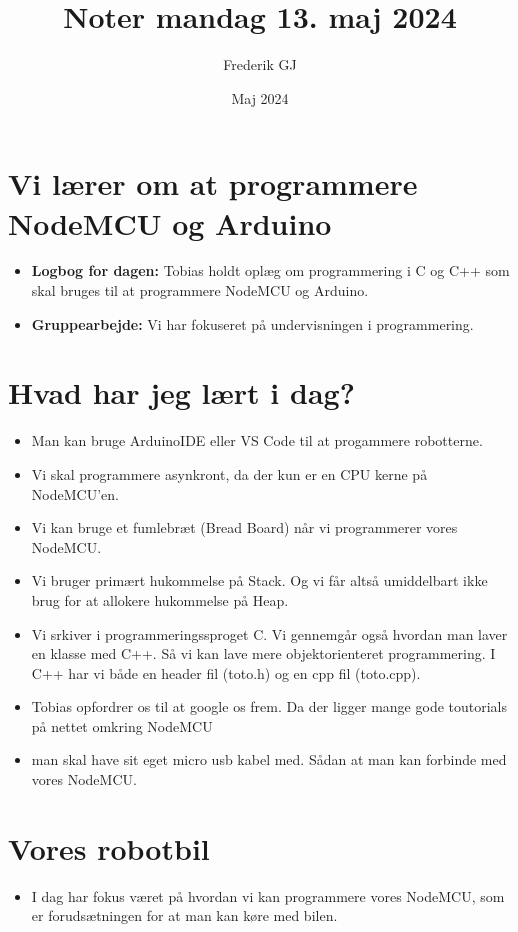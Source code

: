 \documentclass{article}
\title{Noter mandag 13. maj 2024}
\author{Frederik GJ}
\date{Maj 2024}
\begin{document}
\maketitle

\section{Vi lærer om at programmere NodeMCU og Arduino}

\begin{itemize}
    \item \textbf{Logbog for dagen:} Tobias holdt oplæg om programmering i C og C++ som skal bruges til at programmere NodeMCU og Arduino. 
    \item \textbf{Gruppearbejde:} Vi har fokuseret på undervisningen i programmering. 
\end{itemize}

\section{Hvad har jeg lært i dag?}
\begin{itemize}
    \item Man kan bruge ArduinoIDE eller VS Code til at progammere robotterne. 
    \item Vi skal programmere asynkront, da der kun er en CPU kerne på NodeMCU'en. 
    \item Vi kan bruge et fumlebræt (Bread Board) når vi programmerer vores NodeMCU. 
    \item Vi bruger primært hukommelse på Stack. Og vi får altså umiddelbart ikke brug for at allokere hukommelse på Heap. 
    \item Vi srkiver i programmeringssproget C. Vi gennemgår også hvordan man laver en klasse med C++. Så vi kan lave mere objektorienteret programmering. I C++ har vi både en header fil (toto.h) og en cpp fil (toto.cpp). 
    \item Tobias opfordrer os til at google os frem. Da der ligger mange gode toutorials på nettet omkring NodeMCU
    \item man skal have sit eget micro usb kabel med. Sådan at man kan forbinde med vores NodeMCU. 
    
\end{itemize}

\section{Vores robotbil}
\begin{itemize}
    \item I dag har fokus været på hvordan vi kan programmere vores NodeMCU, som er forudsætningen for at man kan køre med bilen. 
\end{itemize}
\end{document}
